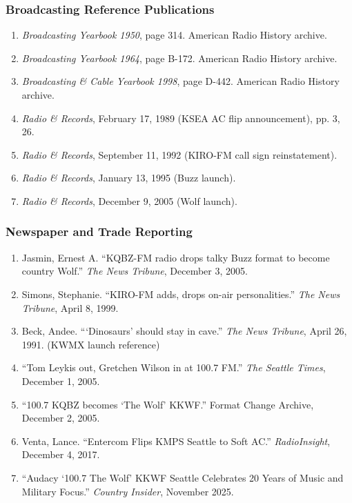 \documentclass[11pt,letterpaper]{article}
\begin{document}
\subsubsection{Broadcasting Reference Publications}
\begin{enumerate}[leftmargin=2em, start=4]
  \item \textit{Broadcasting Yearbook 1950}, page 314. American Radio History archive.
  \item \textit{Broadcasting Yearbook 1964}, page B-172. American Radio History archive.
  \item \textit{Broadcasting \& Cable Yearbook 1998}, page D-442. American Radio History archive.
  \item \textit{Radio \& Records}, February 17, 1989 (KSEA AC flip announcement), pp. 3, 26.
  \item \textit{Radio \& Records}, September 11, 1992 (KIRO-FM call sign reinstatement).
  \item \textit{Radio \& Records}, January 13, 1995 (Buzz launch).
  \item \textit{Radio \& Records}, December 9, 2005 (Wolf launch).
\end{enumerate}

\subsubsection{Newspaper and Trade Reporting}
\begin{enumerate}[leftmargin=2em, start=11]
  \item Jasmin, Ernest A. ``KQBZ-FM radio drops talky Buzz format to become country Wolf.'' \textit{The News Tribune}, December 3, 2005.
  \item Simons, Stephanie. ``KIRO-FM adds, drops on-air personalities.'' \textit{The News Tribune}, April 8, 1999.
  \item Beck, Andee. ```Dinosaurs' should stay in cave.'' \textit{The News Tribune}, April 26, 1991. (KWMX launch reference)
  \item ``Tom Leykis out, Gretchen Wilson in at 100.7 FM.'' \textit{The Seattle Times}, December 1, 2005.
  \item ``100.7 KQBZ becomes `The Wolf' KKWF.'' Format Change Archive, December 2, 2005.
  \item Venta, Lance. ``Entercom Flips KMPS Seattle to Soft AC.'' \textit{RadioInsight}, December 4, 2017.
  \item ``Audacy `100.7 The Wolf' KKWF Seattle Celebrates 20 Years of Music and Military Focus.'' \textit{Country Insider}, November 2025.
\end{enumerate}
\end{document}
